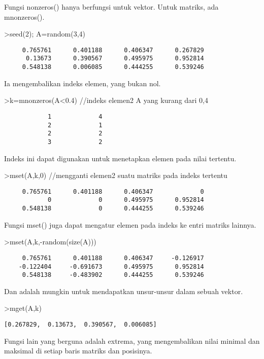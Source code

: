 \documentclass[
]{book}
\begin{document}
Fungsi nonzeros() hanya berfungsi untuk vektor. Untuk matriks, ada mnonzeros().

\textgreater seed(2); A=random(3,4)

\begin{verbatim}
     0.765761      0.401188      0.406347      0.267829 
      0.13673      0.390567      0.495975      0.952814 
     0.548138      0.006085      0.444255      0.539246 
\end{verbatim}

Ia mengembalikan indeks elemen, yang bukan nol.

\textgreater k=mnonzeros(A\textless0.4) //indeks elemen2 A yang kurang dari 0,4

\begin{verbatim}
            1             4 
            2             1 
            2             2 
            3             2 
\end{verbatim}

Indeks ini dapat digunakan untuk menetapkan elemen pada nilai tertentu.

\textgreater mset(A,k,0) //mengganti elemen2 suatu matriks pada indeks tertentu

\begin{verbatim}
     0.765761      0.401188      0.406347             0 
            0             0      0.495975      0.952814 
     0.548138             0      0.444255      0.539246 
\end{verbatim}

Fungsi mset() juga dapat mengatur elemen pada indeks ke entri matriks lainnya.

\textgreater mset(A,k,-random(size(A)))

\begin{verbatim}
     0.765761      0.401188      0.406347     -0.126917 
    -0.122404     -0.691673      0.495975      0.952814 
     0.548138     -0.483902      0.444255      0.539246 
\end{verbatim}

Dan adalah mungkin untuk mendapatkan unsur-unsur dalam sebuah vektor.

\textgreater mget(A,k)

\begin{verbatim}
[0.267829,  0.13673,  0.390567,  0.006085]
\end{verbatim}

Fungsi lain yang berguna adalah extrema, yang mengembalikan nilai minimal dan maksimal di setiap baris matriks dan posisinya.
\end{document}
